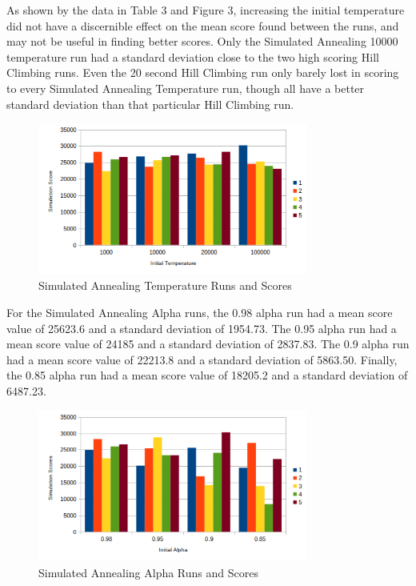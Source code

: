 \documentclass[10pt, twocolumn]{article}
\begin{document}
As shown by the data in Table 3 and Figure 3, increasing the initial temperature did not have
a discernible effect on the mean score found between the runs, and may not be useful in finding
better scores. Only the Simulated Annealing 10000 temperature run had a standard
deviation close to the two high scoring Hill Climbing runs. Even the 20 second Hill Climbing
run only barely lost in scoring to every Simulated Annealing Temperature run, though all have a better
standard deviation than that particular Hill Climbing run.

\medskip
\begin{figure}[!ht]
\centering
\includegraphics[width=3.5in]{temperature_scores.png}
\caption{Simulated Annealing Temperature Runs and Scores}
\label{fig_3}
\end{figure}
\medskip

For the Simulated Annealing Alpha runs, the 0.98 alpha run had a mean score value of 25623.6 and
a standard deviation of 1954.73. The 0.95 alpha run had a mean score value
of 24185 and a standard deviation of 2837.83. The 0.9 alpha run had a
mean score value of 22213.8 and a standard deviation of 5863.50. Finally, the
0.85 alpha run had a mean score value of 18205.2 and a standard deviation
of 6487.23.

\medskip
\begin{figure}[!ht]
\centering
\includegraphics[width=3.5in]{alpha_scores.png}
\caption{Simulated Annealing Alpha Runs and Scores}
\label{fig_4}
\end{figure}
\medskip
\end{document}
